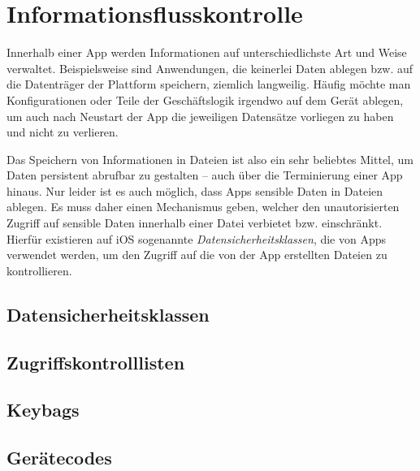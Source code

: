 \section{Informationsflusskontrolle}
Innerhalb einer App werden Informationen auf unterschiedlichste Art und Weise
verwaltet. Beispielsweise sind Anwendungen, die keinerlei Daten ablegen bzw. auf
die Datenträger der Plattform speichern, ziemlich langweilig. Häufig möchte man
Konfigurationen oder Teile der Geschäftslogik irgendwo auf dem Gerät ablegen, um
auch nach Neustart der App die jeweiligen Datensätze vorliegen zu haben und
nicht zu verlieren.

Das Speichern von Informationen in Dateien ist also ein sehr beliebtes Mittel,
um Daten persistent abrufbar zu gestalten -- auch über die Terminierung einer
App hinaus. Nur leider ist es auch möglich, dass Apps sensible Daten in Dateien
ablegen.  Es muss daher einen Mechanismus geben, welcher den unautorisierten
Zugriff auf sensible Daten innerhalb einer Datei verbietet bzw.  einschränkt.
Hierfür existieren auf iOS sogenannte \textit{Datensicherheitsklassen}, die von
Apps verwendet werden, um den Zugriff auf die von der App erstellten Dateien zu
kontrollieren.

\subsection{Datensicherheitsklassen}

\subsection{Zugriffskontrolllisten}

\subsection{Keybags}

\subsection{Gerätecodes}

